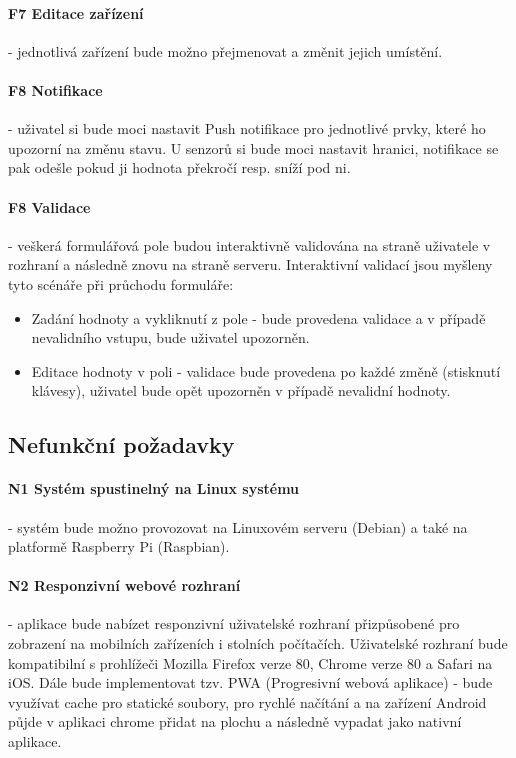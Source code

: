 \documentclass[thesis=B,czech]{FITthesis}[2019/12/23]
\begin{document}
\paragraph{F7 Editace zařízení}
- jednotlivá zařízení bude možno přejmenovat a změnit jejich umístění.

\paragraph{F8 Notifikace}
- uživatel si bude moci nastavit Push notifikace pro jednotlivé prvky, které ho upozorní na změnu stavu. U senzorů si bude moci nastavit hranici, notifikace se pak odešle pokud ji hodnota překročí resp. sníží pod ni.

\paragraph{F8 Validace}
- veškerá formulářová pole budou interaktivně validována na straně uživatele v rozhraní a následně znovu na straně serveru. Interaktivní validací jsou myšleny tyto scénáře při průchodu formuláře:
\begin{itemize}
    \item Zadání hodnoty a vykliknutí z pole - bude provedena validace a v případě nevalidního vstupu, bude uživatel upozorněn.
    \item Editace hodnoty v poli - validace bude provedena po každé změně (stisknutí klávesy), uživatel bude opět upozorněn v případě nevalidní hodnoty.
\end{itemize}


\subsection{Nefunkční požadavky}

\paragraph{N1 Systém spustinelný na Linux systému}
- systém bude možno provozovat na Linuxovém serveru (Debian) a také na platformě Raspberry Pi (Raspbian).

\paragraph{N2 Responzivní webové rozhraní}
- aplikace bude nabízet responzivní uživatelské rozhraní přizpůsobené pro zobrazení na mobilních zařízeních i stolních počítačích. Uživatelské rozhraní bude kompatibilní s prohlížeči Mozilla Firefox verze 80, Chrome verze 80 a Safari na iOS. Dále bude implementovat tzv. PWA (Progresivní webová aplikace) - bude využívat cache pro statické soubory, pro rychlé načítání a na zařízení Android půjde v aplikaci chrome přidat na plochu a následně vypadat jako nativní aplikace.
\end{document}
